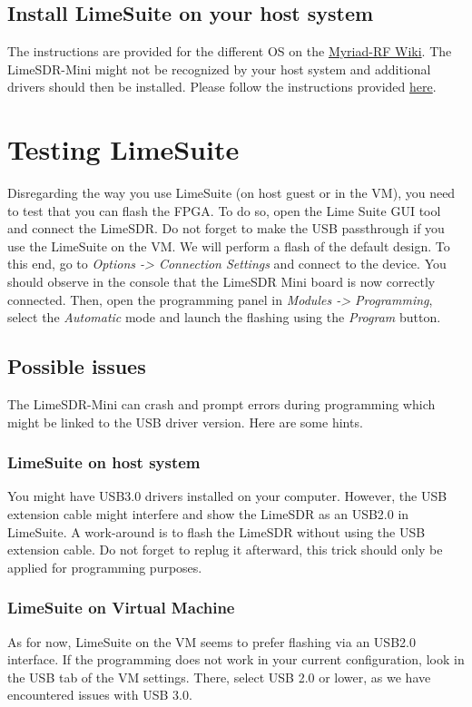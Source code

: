 \subsection{Install LimeSuite on your host system}

The instructions are provided for the different OS on the \href{http://wiki.myriadrf.org/Lime_Suite}{Myriad-RF Wiki}. The LimeSDR-Mini might not be recognized by your host system and additional drivers should then be installed. Please follow the instructions provided \href{https://wiki.myriadrf.org/LimeSDR_Windows_Driver_Installation}{here}.




\section{Testing LimeSuite}

Disregarding the way you use LimeSuite (on host guest or in the VM), you need to test that you can flash the FPGA. To do so, open the Lime Suite GUI tool and connect the LimeSDR. Do not forget to make the USB passthrough if you use the LimeSuite on the VM. We will perform a flash of the default design. To this end, go to \textit{Options -> Connection Settings} and connect to the device. You should observe in the console that the LimeSDR Mini board is now correctly connected. Then, open the programming panel in \textit{Modules -> Programming}, select the \textit{Automatic} mode and launch the flashing using the \textit{Program} button.

\subsection{Possible issues}
The LimeSDR-Mini can crash and prompt errors during programming which might be linked to the USB driver version. Here are some hints.

\subsubsection{LimeSuite on host system}
You might have USB3.0 drivers installed on your computer. However, the USB extension cable might interfere and show the LimeSDR as an USB2.0 in LimeSuite. A work-around is to flash the LimeSDR without using the USB extension cable. Do not forget to replug it afterward, this trick should only be applied for programming purposes.


\subsubsection{LimeSuite on Virtual Machine}
As for now, LimeSuite on the VM seems to prefer flashing via an USB2.0 interface. If the programming does not work in your current configuration, look in the USB tab of the VM settings. There, select USB 2.0 or lower, as we have encountered issues with USB 3.0.
